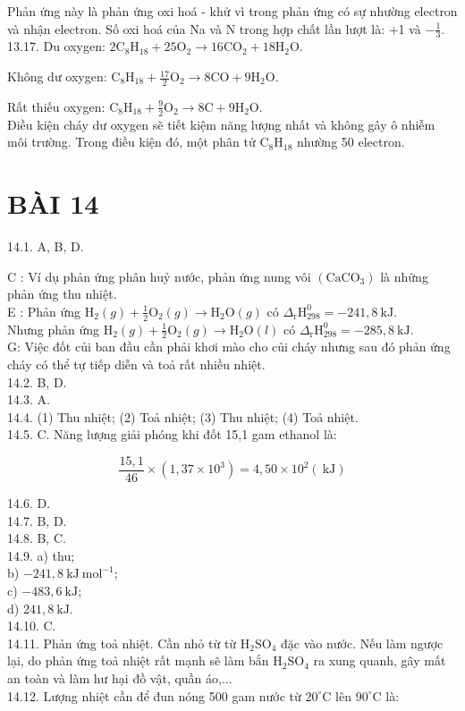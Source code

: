 \documentclass[10pt]{article}
\begin{document}
Phản ứng này là phản ứng oxi hoá - khử vì trong phản ứng có sự nhường electron và nhận electron. Số oxi hoá của Na và N trong hợp chất lần lượt là: +1 và $-\frac{1}{3}$.\\
13.17. Du oxygen: $2 \mathrm{C}_{8} \mathrm{H}_{18}+25 \mathrm{O}_{2} \rightarrow 16 \mathrm{CO}_{2}+18 \mathrm{H}_{2} \mathrm{O}$.

Không dư oxygen: $\mathrm{C}_{8} \mathrm{H}_{18}+\frac{17}{2} \mathrm{O}_{2} \rightarrow 8 \mathrm{CO}+9 \mathrm{H}_{2} \mathrm{O}$.

Rất thiếu oxygen: $\mathrm{C}_{8} \mathrm{H}_{18}+\frac{9}{2} \mathrm{O}_{2} \rightarrow 8 \mathrm{C}+9 \mathrm{H}_{2} \mathrm{O}$.\\
Điều kiện cháy dư oxygen sẽ tiết kiệm năng lượng nhất và không gây ô nhiễm môi trường. Trong điều kiện đó, một phân tử $\mathrm{C}_{8} \mathrm{H}_{18}$ nhường 50 electron.

\section*{BÀI 14}
14.1. A, B, D.

C : Ví dụ phản ứng phân huỷ nước, phản ứng nung vôi $\left(\mathrm{CaCO}_{3}\right)$ là những phản ứng thu nhiệt.\\
E : Phản ứng $\mathrm{H}_{2}(g)+\frac{1}{2} \mathrm{O}_{2}(g) \rightarrow \mathrm{H}_{2} \mathrm{O}(g)$ có $\Delta_{\mathrm{r}} \mathrm{H}_{298}^{0}=-241,8 \mathrm{~kJ}$.\\
Nhưng phản ứng $\mathrm{H}_{2}(g)+\frac{1}{2} \mathrm{O}_{2}(g) \rightarrow \mathrm{H}_{2} \mathrm{O}(l)$ có $\Delta_{\mathrm{r}} \mathrm{H}_{298}^{0}=-285,8 \mathrm{~kJ}$.\\
G: Việc đốt củi ban đầu cần phải khơi mào cho củi cháy nhưng sau đó phản ứng cháy có thể tự tiếp diễn và toả rất nhiều nhiệt.\\
14.2. B, D.\\
14.3. A.\\
14.4. (1) Thu nhiệt; (2) Toả nhiệt; (3) Thu nhiệt; (4) Toả nhiệt.\\
14.5. C. Năng lượng giải phóng khi đốt 15,1 gam ethanol là:

$$
\frac{15,1}{46} \times\left(1,37 \times 10^{3}\right)=4,50 \times 10^{2}(\mathrm{~kJ})
$$

14.6. D.\\
14.7. B, D.\\
14.8. B, C.\\
14.9. a) thu;\\
b) $-241,8 \mathrm{~kJ} \mathrm{~mol}^{-1}$;\\
c) $-483,6 \mathrm{~kJ}$;\\
d) $241,8 \mathrm{~kJ}$.\\
14.10. C.\\
14.11. Phản ứng toả nhiệt. Cần nhỏ từ từ $\mathrm{H}_{2} \mathrm{SO}_{4}$ đặc vào nước. Nếu làm ngược lại, do phản ứng toả nhiệt rất mạnh sẽ làm bắn $\mathrm{H}_{2} \mathrm{SO}_{4}$ ra xung quanh, gây mất an toàn và làm hư hại đồ vật, quần áo,...\\
14.12. Lượng nhiệt cần để đun nóng 500 gam nước từ $20^{\circ} \mathrm{C}$ lên $90^{\circ} \mathrm{C}$ là:
\end{document}
